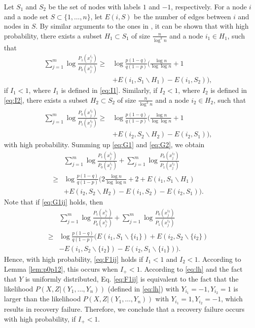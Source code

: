 \documentclass[conference]{IEEEtran}
\begin{document}
		Let $S_1$ and $S_2$ be the set of nodes with labels $1$ and $-1$, respectively. For a node $i$ and a node set $S\subset\{1,\ldots,n\}$,
		let $E(i,S)$ be the number of edges between $i$ and nodes in $S$.
		By similar arguments to the ones in \cite{abbe2015exact}, it can be shown that with high probability, there exists a subset
		 $H_1\subset S_1$ of size $\frac{n}{\log^3 n}$ and a node $i_1\in H_1$, such that  
		\begin{align}
			\sum_{j=1}^{m} \log \frac{P_1(x^{i_1}_{j})}{P_0(x^{i_1}_{j})}
			\ge &\log \frac{p(1-q)}{q(1-p)}\Big(\frac{\log n}{\log\log n}+1\nonumber\\
			&+E(i_1, S_1 \backslash H_1) - E(i_1, S_2) \Big) \label{eq:G1},
		\end{align}	
	if $I_1<1$, where $I_1$ is defined in \eqref{eq:I1}. Similarly, if $I_2<1$, where $I_2$ is defined in \eqref{eq:I2}, there exists a subset
		$H_2\subset S_2$ of size $\frac{n}{\log^3 n}$ and a node $i_2\in H_2$, such that  
		\begin{align}
			\sum_{j=1}^{m} \log \frac{P_0(x^{i_2}_{j})}{P_1(x^{i_2}_{j})}
			\ge &\log \frac{p(1-q)}{q(1-p)}\Big(\frac{\log n}{\log\log n}+1\nonumber\\
			&+E(i_2, S_2 \backslash H_2) - E(i_2, S_1) \Big) \label{eq:G2},
		\end{align}	
	with high probability. Summing up \eqref{eq:G1} and \eqref{eq:G2}, we obtain	
		\begin{align}
			&\sum_{j=1}^{m} \log \frac{P_1(x^{i_1}_{j})}{P_0(x^{i_1}_{j})}
			+\sum_{j=1}^{m} \log \frac{P_0(x^{i_2}_{j})}{P_1(x^{i_2}_{j})}\nonumber\\    
			\ge &\log \frac{p(1-q)}{q(1-p)}\Big(2\frac{\log n}{\log\log n}+2+E(i_1, S_1 \backslash H_1) \nonumber\\
			&+ E(i_2, S_2 \backslash H_2)- E(i_1, S_2 ) - E(i_2, S_1 )\Big) \label{eq:G1ij}.
		\end{align}	
		Note that if \eqref{eq:G1ij} holds, then
		\begin{align}
			&\sum_{j=1}^{m} \log \frac{P_1(x^{i_1}_{j})}{P_0(x^{i_1}_{j})}
			+\sum_{j=1}^{m} \log \frac{P_0(x^{i_2}_{j})}{P_1(x^{i_2}_{j})}\nonumber\\
			\ge &\log \frac{p(1-q)}{q(1-p)}(E(i_1, S_1 \backslash \{i_1\}) + E(i_2, S_2 \backslash \{i_2\})\nonumber\\
			&- E(i_1, S_2 \backslash \{i_2\}) - E(i_2, S_1 \backslash \{i_1\})) \label{eq:F1ij}.
		\end{align}
		Hence, with high probability, \eqref{eq:F1ij} holds if $I_1<1$ and $I_2<1$. According to Lemma \ref{lem:p0p12}, this occurs when $I_+<1$. According to \eqref{eq:lh} and the fact that $Y$ is uniformly distributed, Eq. \eqref{eq:F1ij} is equivalent to the fact that the likelihood $P(X,Z|(Y_1,\ldots,Y_n))$ (defined in \eqref{eq:lh}) with $Y_{i_1}=-1,Y_{i_2}=1$ is larger than the likelihood $P(X,Z|(Y_1,\ldots,Y_n))$ with $Y_{i_1}=1,Y_{i_2}=-1$, which results in  recovery failure. Therefore, we conclude that a recovery failure occurs with high probability, if $I_+<1$.  
\end{document}
